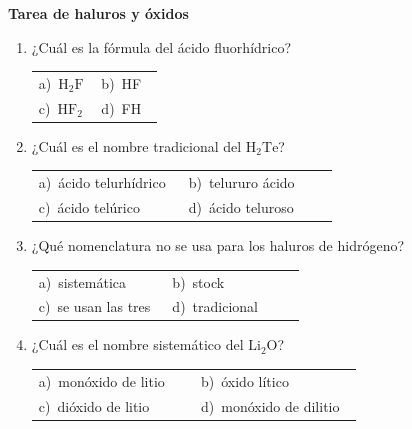 \documentclass[11pt,a4paper]{article}
\begin{document}
{\Large\bfseries Tarea de haluros y óxidos}
\vspace{12pt}
\begin{enumerate}[label=\textbf{\arabic*.},leftmargin=*,itemsep=11pt,topsep=0pt]
\item \begin{minipage}[t]{\linewidth}
¿Cuál es la fórmula del ácido fluorhídrico?

\vspace{5pt}
\begin{tabular}{@{}p{0.47\linewidth}p{0.47\linewidth}@{}}
a)~$\mathrm{H_{2}F}$ & b)~HF \\
c)~$\mathrm{HF_{2}}$ & d)~FH \\
\end{tabular}
\end{minipage}

\item \begin{minipage}[t]{\linewidth}
¿Cuál es el nombre tradicional del $\mathrm{H_{2}Te}$?

\vspace{5pt}
\begin{tabular}{@{}p{0.47\linewidth}p{0.47\linewidth}@{}}
a)~ácido telurhídrico & b)~telururo ácido \\
c)~ácido telúrico & d)~ácido teluroso \\
\end{tabular}
\end{minipage}

\item \begin{minipage}[t]{\linewidth}
¿Qué nomenclatura no se usa para los haluros de hidrógeno?

\vspace{5pt}
\begin{tabular}{@{}p{0.47\linewidth}p{0.47\linewidth}@{}}
a)~sistemática & b)~stock \\
c)~se usan las tres & d)~tradicional \\
\end{tabular}
\end{minipage}

\item \begin{minipage}[t]{\linewidth}
¿Cuál es el nombre sistemático del $\mathrm{Li_{2}O}$?

\vspace{5pt}
\begin{tabular}{@{}p{0.47\linewidth}p{0.47\linewidth}@{}}
a)~monóxido de litio & b)~óxido lítico \\
c)~dióxido de litio & d)~monóxido de dilitio \\
\end{tabular}
\end{minipage}


\end{enumerate}
\end{document}
